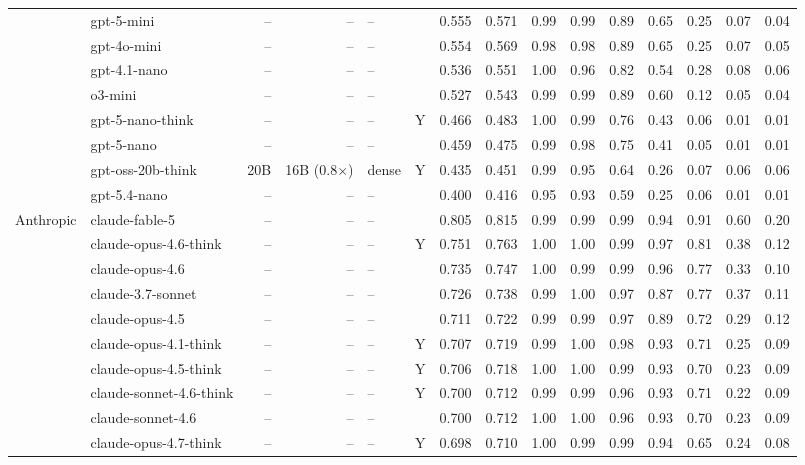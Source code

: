 \begin{longtable}{@{}ll r r l c rr rrrrrrr@{}}
 & gpt-5-mini & -- & -- & -- &  & 0.555 & 0.571 & 0.99 & 0.99 & 0.89 & 0.65 & 0.25 & 0.07 & 0.04 \\
 & gpt-4o-mini & -- & -- & -- &  & 0.554 & 0.569 & 0.98 & 0.98 & 0.89 & 0.65 & 0.25 & 0.07 & 0.05 \\
 & gpt-4.1-nano & -- & -- & -- &  & 0.536 & 0.551 & 1.00 & 0.96 & 0.82 & 0.54 & 0.28 & 0.08 & 0.06 \\
 & o3-mini & -- & -- & -- &  & 0.527 & 0.543 & 0.99 & 0.99 & 0.89 & 0.60 & 0.12 & 0.05 & 0.04 \\
 & gpt-5-nano-think & -- & -- & -- & Y & 0.466 & 0.483 & 1.00 & 0.99 & 0.76 & 0.43 & 0.06 & 0.01 & 0.01 \\
 & gpt-5-nano & -- & -- & -- &  & 0.459 & 0.475 & 0.99 & 0.98 & 0.75 & 0.41 & 0.05 & 0.01 & 0.01 \\
 & gpt-oss-20b-think & 20B & 16B (0.8$\times$) & dense & Y & 0.435 & 0.451 & 0.99 & 0.95 & 0.64 & 0.26 & 0.07 & 0.06 & 0.06 \\
 & gpt-5.4-nano & -- & -- & -- &  & 0.400 & 0.416 & 0.95 & 0.93 & 0.59 & 0.25 & 0.06 & 0.01 & 0.01 \\
Anthropic & claude-fable-5 & -- & -- & -- &  & 0.805 & 0.815 & 0.99 & 0.99 & 0.99 & 0.94 & 0.91 & 0.60 & 0.20 \\
 & claude-opus-4.6-think & -- & -- & -- & Y & 0.751 & 0.763 & 1.00 & 1.00 & 0.99 & 0.97 & 0.81 & 0.38 & 0.12 \\
 & claude-opus-4.6 & -- & -- & -- &  & 0.735 & 0.747 & 1.00 & 0.99 & 0.99 & 0.96 & 0.77 & 0.33 & 0.10 \\
 & claude-3.7-sonnet & -- & -- & -- &  & 0.726 & 0.738 & 0.99 & 1.00 & 0.97 & 0.87 & 0.77 & 0.37 & 0.11 \\
 & claude-opus-4.5 & -- & -- & -- &  & 0.711 & 0.722 & 0.99 & 0.99 & 0.97 & 0.89 & 0.72 & 0.29 & 0.12 \\
 & claude-opus-4.1-think & -- & -- & -- & Y & 0.707 & 0.719 & 0.99 & 1.00 & 0.98 & 0.93 & 0.71 & 0.25 & 0.09 \\
 & claude-opus-4.5-think & -- & -- & -- & Y & 0.706 & 0.718 & 1.00 & 1.00 & 0.99 & 0.93 & 0.70 & 0.23 & 0.09 \\
 & claude-sonnet-4.6-think & -- & -- & -- & Y & 0.700 & 0.712 & 0.99 & 0.99 & 0.96 & 0.93 & 0.71 & 0.22 & 0.09 \\
 & claude-sonnet-4.6 & -- & -- & -- &  & 0.700 & 0.712 & 1.00 & 1.00 & 0.96 & 0.93 & 0.70 & 0.23 & 0.09 \\
 & claude-opus-4.7-think & -- & -- & -- & Y & 0.698 & 0.710 & 1.00 & 0.99 & 0.99 & 0.94 & 0.65 & 0.24 & 0.08 \\

\end{longtable}
